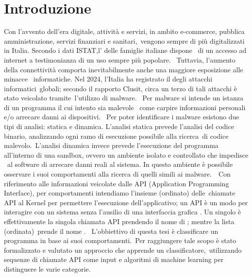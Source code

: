 

\chapter{Introduzione}



Con l'avvento dell'era digitale, attività e servizi, in ambito e-commerce, pubblica amministrazione, servizi finanziari e sanitari,\
vengono sempre di più digitalizzati in Italia. Secondo i dati ISTAT,l' delle famiglie italiane dispone \
di un accesso ad internet a testimonianza di un uso sempre più popolare.
\
Tuttavia, l'aumento della connettività comporta inevitabilmente anche una maggiore esposizione alle minacce \
informatiche. Nel 2024, l'Italia ha registrato il  degli attacchi informatici\
globali; secondo il rapporto Clusit, circa un terzo di tali attacchi è stato veicolato tramite\
l'utilizzo di malware.
\
Per malware si intende un istanza di un programma il cui intento sia malevole \
come carpire informazioni personali e/o arrecare danni ai dispositivi.
\
Per poter identificare i malware esistono due tipi di analisi: statica e dinamica.
L'analisi statica prevede l'analisi del codice binario, analizzando ogni ramo di esecuzione possibile alla ricerca\
di codice malevolo.\
L'analisi dinamica invece prevede l'esecuzione del programma all'interno di una sandbox, ovvero un ambiente isolato e controllato che impedisce \
al software di arrecare danni reali al sistema. In questo ambiente è possibile osservare i suoi comportamenti alla ricerca
di quelli simili ai malware\mycite{doi:10.1155/2015/659101}.\
\
Con riferimento alle informazioni veicolate dalle API (Application Programming Interface), per comportamenti intendiamo l'insieme (ordinato) delle\
chiamate API al Kernel per permettere l'esecuzione dell'applicativo; un API è un modo per interagire con un sistema senza l'ausilio di una interfaccia grafica .
Un singolo \myquote{comportamento} è effettivamente la singola chiamata API prendendo il nome di ; mentre la lista (ordinata)\
prende il nome .
\
L'obbiettivo di questa tesi è classificare un programma in base ai suoi comportamenti.\
Per raggiungere tale scopo è stato formalizzato e valutato un approccio che apprende un classificatore,\
utilizzando sequenze di chiamate API come input e algoritmi di machine learning per distinguere le varie categorie.

